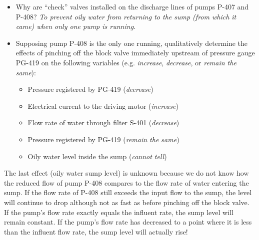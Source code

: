 
\begin{itemize}
\item{} Why are ``check'' valves installed on the discharge lines of pumps P-407 and P-408? {\it To prevent oily water from returning to the sump (from which it came) when only one pump is running.}
\vskip 10pt
\item{} Supposing pump P-408 is the only one running, qualitatively determine the effects of pinching off the block valve immediately upstream of pressure gauge PG-419 on the following variables (e.g. {\it increase}, {\it decrease}, or {\it remain the same}):
\begin{itemize}
\item{} Pressure registered by PG-419 ({\it decrease})
\item{} Electrical current to the driving motor ({\it increase})
\item{} Flow rate of water through filter S-401 ({\it decrease})
\item{} Pressure registered by PG-419 ({\it remain the same})
\item{} Oily water level inside the sump ({\it cannot tell})
\end{itemize}
\end{itemize}

The last effect (oily water sump level) is unknown because we do not know how the reduced flow of pump P-408 compares to the flow rate of water entering the sump.  If the flow rate of P-408 still exceeds the input flow to the sump, the level will continue to drop although not as fast as before pinching off the block valve.  If the pump's flow rate exactly equals the influent rate, the sump level will remain constant.  If the pump's flow rate has decreased to a point where it is less than the influent flow rate, the sump level will actually rise!











